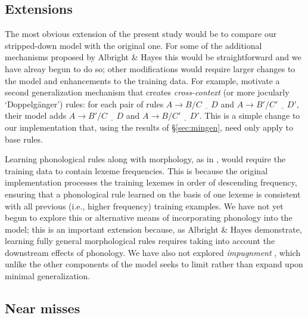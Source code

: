 \documentclass[11pt]{article}
\begin{document}
\subsection{Extensions}

The most obvious extension of the present study would be to compare our stripped-down model with the original one. For some of the additional mechanisms proposed by Albright \& Hayes this would be straightforward and we have alreay begun to do so; other modifications would require larger changes to the model and enhancements to the training data. For example, \citet[][\S3.4]{albright-hayes-2002-modeling} motivate a second generalization mechanism that creates \emph{cross-context} (or more jocularly `Doppelg\"anger') rules: for each pair of rules $A \to B / C \ \underline{\ \ \ } \ D$ and $A \to B' / C' \ \underline{\ \ \ } \ D'$, their model adds $A \to B' / C \ \underline{\ \ \ } \ D$ and $A \to B / C' \ \underline{\ \ \ } \ D'$. This is a simple change to our implementation that, using the results of \S\ref{sec:mingen}, need only apply to base rules.

Learning phonological rules along with morphology, as in \citet[][\S3.3]{albright-hayes-2002-modeling}, would require the training data to contain lexeme frequencies. This is because the original implementation processes the training lexemes in order of descending frequency, ensuring that a phonological rule learned on the basis of one lexeme is consistent with all previous (i.e., higher frequency) training examples. We have not yet begun to explore this or alternative means of incorporating phonology into the model; this is an important extension because, as Albright \& Hayes demonstrate, learning fully general morphological rules requires taking into account the downstream effects of phonology. We have also not explored \emph{impugnment} \citep[][\S3.7]{albright-hayes-2002-modeling}, which unlike the other components of the model seeks to limit rather than expand upon minimal generalization.



\subsection{Near misses}
\end{document}
